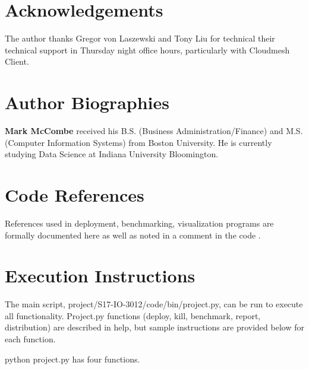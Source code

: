 \documentclass[9pt,twocolumn,twoside]{../../styles/osajnl}
\begin{document}
\section*{Acknowledgements}

The author thanks Gregor von Laszewski and Tony Liu for technical their technical support in Thursday night office hours, particularly with Cloudmesh Client.




 
\section*{Author Biographies}
\begingroup
\setlength\intextsep{0pt}
\begin{minipage}[t][3.2cm][t]{1.0\columnwidth} %
  \noindent
{\bfseries Mark McCombe} received his B.S. (Business Administration/Finance) and M.S. (Computer Information Systems) from Boston University.  He is currently studying Data Science at Indiana University Bloomington.

\end{minipage}
\endgroup

\newpage

\appendix

\section{Code References}
References used in deployment, benchmarking, visualization programs are formally documented here as well as noted in a comment in the code \cite{www-bashNum} \cite{www-lastChar} \cite{www-configOpts} \cite{www-bashArgs} \cite{www-cmVms}  \cite{www-python1}  \cite{www-python2}  \cite{www-python3} \cite{www-ansibleDir} \cite{www-mongoAnsible} \cite{www-ansibleCopy} \cite{www-ansibleHost} \cite{www-installMongo}.

\section{Execution Instructions}

The main script, project/S17-IO-3012/code/bin/project.py, can be run to execute all functionality.  Project.py functions (deploy, kill, benchmark, report, distribution) are described in help, but sample instructions are provided below for each function.

python project.py has four functions.
\end{document}
